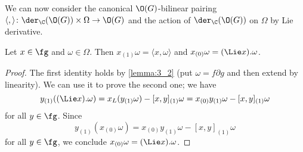 \documentclass[a4paper, 10pt]{article}
\begin{document}
            We can now consider the canonical $\O(G)$-bilinear pairing $\langle , \rangle\colon \der_{\C}(\O(G)) \times \Omega \to \O(G)$ and the action of $\der_{\C}(\O(G))$ on $\Omega$ by Lie derivative.
            \begin{lemma}
                \label{lemma:3_3}
                Let $x \in \fg$ and $\omega \in \Omega$. Then $x_{(1)}\omega = \langle x, \omega \rangle$ and $x_{(0)}\omega = (\Lie x).\omega$.
            \end{lemma}
            \begin{proof}
                The first identity holds by \cref{lemma:3_2} (put $\omega = f\partial g$ and then extend by linearity). We can use it to prove the second one; we have \[y_{(1)}((\Lie x).\omega) = x_L(y_{(1)}\omega) - [x, y]_{(1)}\omega = x_{(0)}y_{(1)}\omega - [x, y]_{(1)}\omega \] for all $y \in \fg$. Since \[y_{(1)}(x_{(0)}\omega) = x_{(0)}y_{(1)}\omega - [x, y]_{(1)}\omega \] for all $y \in \fg$, we conclude $x_{(0)}\omega = (\Lie x).\omega$.
            \end{proof}
\end{document}

